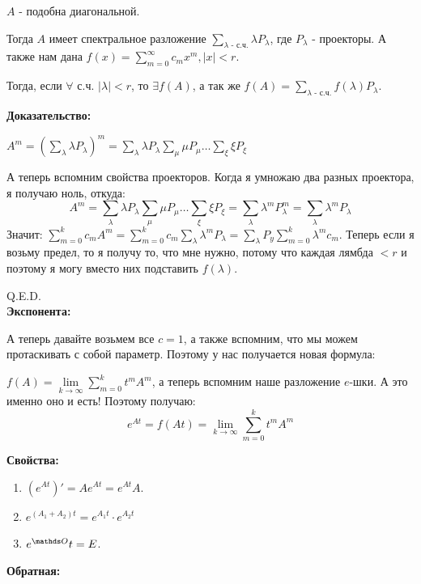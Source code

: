 
$A$ - подобна диагональной.

Тогда $A$ имеет спектральное разложение $\sum\limits_{\lambda \text{ - с.ч.}}\lambda P_\lambda$, где $P_{\lambda}$ - проекторы. А также нам дана $f(x) = \sum\limits_{m=0}^\infty c_m x^m, |x|<r$.

Тогда, если $\forall$ с.ч. $|\lambda|< r$, то $\exists f(A)$, а так же $f(A) = \sum\limits_{\lambda \text{ - с.ч.}}f(\lambda)P_\lambda$.

\textbf{Доказательство:}

$A^m = (\sum\limits_{\lambda }\lambda P_{\lambda})^m = \sum\limits_{\lambda}\lambda P_{\lambda}\sum\limits_{\mu}\mu P_{\mu} \ldots \sum\limits_{\xi}\xi P_{\xi}$

А теперь вспомним свойства проекторов. Когда я умножаю два разных проектора, я получаю ноль, откуда:
$$A^m = \sum\limits_{\lambda}\lambda P_{\lambda}\sum\limits_{\mu}\mu P_{\mu} \ldots \sum\limits_{\xi}\xi P_{\xi} = \sum\limits_{\lambda}\lambda^m P_{\lambda}^m = \sum\limits_{\lambda}\lambda^m P_\lambda$$
Значит: $\sum\limits_{m=0}^k c_m A^m =\sum\limits_{m=0}^k c_m  \sum\limits_{\lambda}\lambda^m P_\lambda =  \sum\limits_{\lambda}P_y \sum\limits_{m=0}^k\lambda^m c_m $.  Теперь если я возьму предел, то я получу то, что мне нужно, потому что каждая лямбда $<r$ и поэтому я могу вместо них подставить $f(\lambda)$.

  \hfill Q.E.D.
\\

\textbf{Экспонента:}

А теперь давайте возьмем все $c=1$,  а также вспомним, что мы можем протаскивать с собой параметр. Поэтому у нас получается новая формула:

$f(A) =\lim\limits_{k\rightarrow\infty}\sum\limits_{m=0}^k    t^mA^m$, а теперь вспомним наше разложение $e$-шки. А это именно оно и есть! Поэтому получаю:
$$e^{At}=f(At) =\lim\limits_{k\rightarrow\infty}\sum\limits_{m=0}^k  t^mA^m$$

\textbf{Свойства:}
\begin{enumerate}
    \item  $(e^{At})' = Ae^{At} = e^{At}A$.

    \item $e^{(A_1+A_2)t}=e^{A_1t}\cdot e^{A_2t}$
    \item $e^{\zero}t = E$.
\end{enumerate}

\textbf{Обратная:}

